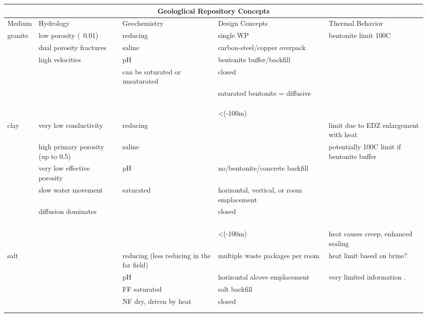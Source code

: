 %
\begin{table}[h!]
  \centering
  \footnotesize{
  \begin{tabularx}{\textwidth}{|l|X|X|X|X|}
    \multicolumn{5}{c}{\textbf{Geologlical Repository Concepts}}\\
    \hline
    Medium & Hydrology & Geochemistry & Design Concepts & Thermal Behavior \\ 
    \hline
    granite&low porosity (~0.01)&reducing&single WP&bentonite limit 100C\\
    &dual porosity fractures&saline&carbon-steel/copper overpack&\\
    &high velocities&pH&bentonite buffer/backfill&\\
    &&can be saturated or unsaturated&closed&\\
    &&&saturated bentonite = diffusive&\\
    &&&&\\
    &&&&\\
    &&&&\\
    &&&<(-100m)&\\
    clay&very low conductivity&reducing&&limit due to EDZ enlargement with heat\\
    &high primary porosity (up to 0.5)&saline&&potentially 100C limit if bentonite buffer\\
    &very low effective porosity&pH&no/bentonite/concrete backfill&\\
    &slow water movement&saturated&horizontal, vertical, or room emplacement&\\
    &diffusion dominates&&closed&\\
    &&&&\\
    &&&&\\
    &&&&\\
    &&&&\\
    &&&<(-100m)&heat causes creep, enhanced sealing\\
    salt&&reducing (less reducing in the far field)& multiple waste packages per room&heat limit based on brine?\\
    &&pH&horizontal alcove emplacement&very limited information .\\
    &&FF saturated&salt backfill&\\
    &&NF dry, driven by heat &closed&\\
    &&&&\\
    &&&&\\

\end{tabularx}}
\end{table}

